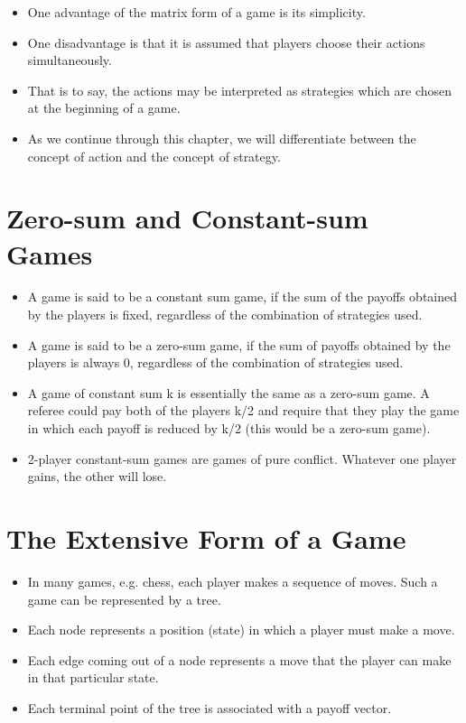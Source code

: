 \documentclass[]{report}
\begin{document}
\begin{itemize}
	\item One advantage of the matrix form of a game is its simplicity.
	\item One disadvantage is that it is assumed that players choose their
	actions simultaneously.
	\item That is to say, the actions may be
	interpreted as strategies which are chosen at the beginning of a
	game.
	\item As we continue through this chapter, we will differentiate between
	the concept of action and the concept of strategy.
	
\end{itemize}

\section{Zero-sum and Constant-sum Games}
\begin{itemize}
	\item A game is said to be a constant sum game, if the sum of the
	payoffs obtained by the players is fixed, regardless of the
	combination of strategies used.
	\item	A game is said to be a zero-sum game, if the sum of payoffs
	obtained by the players is always 0, regardless of the combination
	of strategies used.
	\item A game of constant sum k is essentially the same as a zero-sum
	game. A referee could pay both of the players k/2 and require that
	they play the game in which each payoff is reduced by k/2 (this
	would be a zero-sum game).
	\item	2-player constant-sum games are games of pure conflict.
	Whatever one player gains, the other will lose.
\end{itemize}

\section{The Extensive Form of a Game}
\begin{itemize}
	\item In many games, e.g. chess, each player makes a sequence of moves.
	Such a game can be represented by a tree. 
		\item  Each node represents a
	position (state) in which a player must make a move.
	\item 	Each edge coming out of a node represents a move that the player
	can make in that particular state.
	\item 	Each terminal point of the tree is associated with a payoff vector.
\end{itemize}
\end{document}
